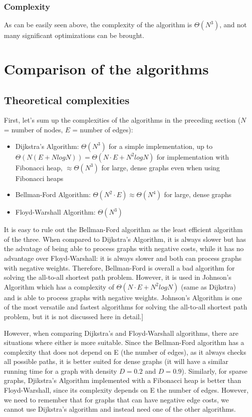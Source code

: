 \documentclass[runningheads]{llncs}
\begin{document}
\subsubsection{Complexity}
As can be easily seen above, the complexity of the algorithm is $\Theta(N^3)$, and not many significant optimizations can be brought.

\section{Comparison of the algorithms}
\subsection{Theoretical complexities}
First, let's sum up the complexities of the algorithms in the preceding section ($N$ = number of nodes, $E$ = number of edges):
\begin{itemize}
	\item Dijkstra's Algorithm:  $\Theta(N^3)$ for a simple implementation, up to $\Theta(N(E+NlogN)) = \Theta(N \cdot E + N^2logN)$ for implementation with Fibonacci heap,  $\approx \Theta(N^3)$ for large, dense graphs even when using Fibonacci heaps
	\item Bellman-Ford Algorithm: $\Theta(N^2 \cdot E) \approx \Theta(N^4)$ for large, dense graphs
	\item Floyd-Warshall Algorithm: $\Theta(N^3)$
\end{itemize}

It is easy to rule out the Bellman-Ford algorithm as the least efficient algorithm of the three. When compared to Dijkstra's Algorithm, it is always slower but has the advatage of being able to process graphs with negative costs, while it has no advantage over Floyd-Warshall: it is always slower and both can process graphs with negative weights. Therefore, Bellman-Ford is overall a bad algorithm for solving the all-to-all shortest path problem. However, it is used in Johnson's Algorithm which has a complexity of $\Theta(N \cdot E + N^2logN)$ (same as Dijkstra) and is able to process graphs with negative weights. Johnson's Algorithm is one of the most versatile and fastest algorithms for solving the all-to-all shortest path problem, but it is not discussed here in detail.]

However, when comparing Dijkstra's and Floyd-Warshall algorithms, there are situations where either is more suitable. Since the Bellman-Ford algorithm has a complexity that does not depend on E (the number of edges), as it always checks all possible paths, it is better suited for dense graphs (it will have a similar running time for a graph with density $D=0.2$ and $D=0.9$). Similarly, for sparse graphs, Djikstra's Algorithm implemented with a Fibonacci heap is better than Floyd-Warshall, since its complexity depends on E the number of edges. However, we need to remember that for graphs that can have negative edge costs, we cannot use Dijkstra's algorithm and instead need one of the other algorithms.
\end{document}
